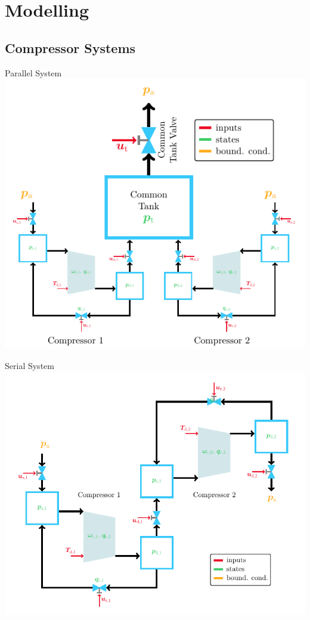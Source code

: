 \section{Modelling}

\subsection{Compressor Systems}

\begin{frame}{Parallel System}
    \centering
    \includegraphics[width=.7\linewidth]{modelling/diagram_parallel.png}
\end{frame}

\begin{frame}{Serial System}
    \centering
    \includegraphics[width=.7\linewidth]{modelling/diagram_serial.png}
\end{frame}

\subsection{~}
